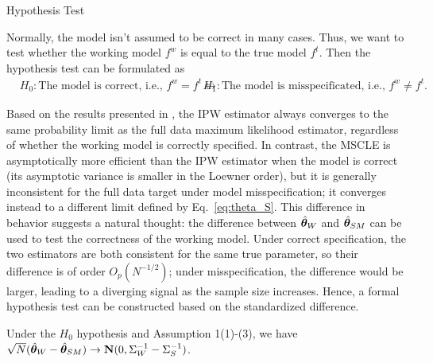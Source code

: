 \documentclass[12pt,hidelinks]{article}
\begin{document}
\begin{section}{Hypothesis Test}

Normally, the model isn't assumed to be correct in many cases. Thus, we want to test whether the working model $f^w$ is equal to the true model $f^t$.
Then the hypothesis test can be formulated as
\begin{align}
    &H_0: \text{The model is correct, i.e., } f^w=f^t
    \leftrightarrow & H_1: \text{The model is misspecificated, i.e., } f^w \neq f^t.
\end{align}

Based on the results presented in \citet{wang2022maximum}, the IPW estimator always converges to the same probability limit as the full data maximum likelihood estimator, regardless of whether the working model is correctly specified. 
In contrast, the MSCLE is asymptotically more efficient than the IPW estimator when the model is correct (its asymptotic variance is smaller in the Loewner order), but it is generally inconsistent for the full data target under model misspecification; it converges instead to a different limit defined by Eq.~\eqref{eq:theta_S}. This difference in behavior suggests a natural thought: the difference between ${\hat{\bm{\theta}}}_W$ and ${\hat{\bm{\theta}}}_{SM}$ can be used to test the correctness of the working model. Under correct specification, the two estimators are both consistent for the same true parameter, so their difference is of order $O_{p}(N^{-1/2})$; under misspecification, the difference would be larger, leading to a diverging signal as the sample size increases. Hence, a formal hypothesis test can be constructed based on the standardized difference.

\begin{proposition}\label{prop:diff_norm}
    Under the $H_0$ hypothesis and Assumption 1(1)-(3), we have $\sqrt{N}({\hat{\bm{\theta}}}_W - {\hat{\bm{\theta}}}_{SM}) \rightarrow \mathbf{N}(0, \Sigma_{W}^{-1} - \Sigma_{S}^{-1})$.
\end{proposition}


\end{section}
\end{document}
